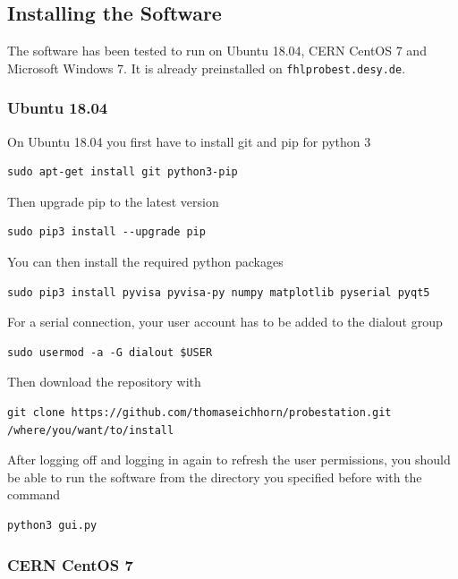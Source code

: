\documentclass[a4paper]{article}
\begin{document}
\subsection{Installing the Software}
\label{sec:installation}

The software has been tested to run on Ubuntu 18.04, CERN CentOS 7 and Microsoft Windows 7.
It is already preinstalled on {\tt fhlprobest.desy.de}.

\subsubsection{Ubuntu 18.04}

On Ubuntu 18.04 you first have to install git and pip for python 3

\begin{lstlisting}
sudo apt-get install git python3-pip
\end{lstlisting}

Then upgrade pip to the latest version

\begin{lstlisting}
sudo pip3 install --upgrade pip
\end{lstlisting}

You can then install the required python packages

\begin{lstlisting}
sudo pip3 install pyvisa pyvisa-py numpy matplotlib pyserial pyqt5
\end{lstlisting}

For a serial connection, your user account has to be added to the dialout group

\begin{lstlisting}
sudo usermod -a -G dialout $USER
\end{lstlisting}

Then download the repository with

\begin{lstlisting}
git clone https://github.com/thomaseichhorn/probestation.git /where/you/want/to/install
\end{lstlisting}

After logging off and logging in again to refresh the user permissions, you should be able to run the software from the directory you specified before with the command

\begin{lstlisting}
python3 gui.py
\end{lstlisting}

\subsubsection{CERN CentOS 7}
\end{document}
